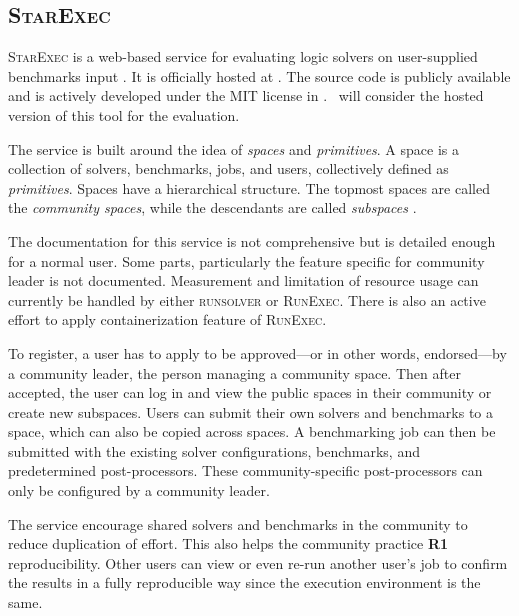 \subsection{\textsc{StarExec}}

\textsc{StarExec} is a web-based service for evaluating logic solvers on user-supplied benchmarks input \citep{stumpStarExecCrossCommunityInfrastructure2014}.
It is officially hosted at \href{https://www.starexec.org/}{}.
The source code is publicly available and is actively developed under the MIT license in \citet{StarExecCrossCommunity2019}.
\First~will consider the hosted version of this tool for the evaluation.

The service is built around the idea of \emph{spaces} and \emph{primitives}.
A space is a collection of solvers, benchmarks, jobs, and users, collectively defined as \emph{primitives}.
Spaces have a hierarchical structure.
The topmost spaces are called the \emph{community spaces}, while the descendants are called \emph{subspaces} \citep{stumpStarExecCrossCommunityInfrastructure2014}.

The documentation for this service is not comprehensive but is detailed enough for a normal user.
Some parts, particularly the feature specific for community leader is not documented.
Measurement and limitation of resource usage can currently be handled by either \textsc{runsolver} or \textsc{RunExec}.
There is also an active effort to apply containerization feature of \textsc{RunExec}.

To register, a user has to apply to be approved---or in other words, endorsed---by a community leader, the person managing a community space.
Then after accepted, the user can log in and view the public spaces in their community or create new subspaces.
Users can submit their own solvers and benchmarks to a space, which can also be copied across spaces.
A benchmarking job can then be submitted with the existing solver configurations, benchmarks, and predetermined post-processors.
These community-specific post-processors can only be configured by a community leader.

The service encourage shared solvers and benchmarks in the community to reduce duplication of effort.
This also helps the community practice \textbf{R1} reproducibility.
Other users can view or even re-run another user's job to confirm the results in a fully reproducible way since the execution environment is the same.

